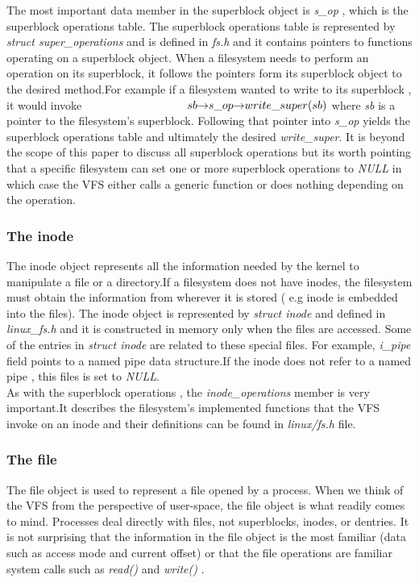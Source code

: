 \documentclass[conference]{IEEEtran}
\begin{document}
The most important data member in the superblock object is {\em s\_op }, which is the superblock operations table. The superblock operations 
table is represented by {\em struct super\_operations } and is defined in {\em fs.h} and it contains pointers
to functions operating on a superblock object. When a filesystem needs to perform an operation on its superblock,
it follows the pointers form its superblock object to the desired method.For example if a filesystem wanted to 
write to its superblock , it would invoke 
\begin{math}\indent\indent\indent\indent\indent\indent sb{\rightarrow}s\_op{\rightarrow}write\_super(sb) \\
\end{math}
where {\em sb} is a pointer to the filesystem's superblock. Following that pointer into {\em s\_op} yields the
superblock operations table and ultimately the desired {\em write\_super}. It is beyond the scope of this paper
to discuss all superblock operations but its worth pointing that a specific filesystem can set one or more superblock 
operations to {\em NULL} in which case the VFS either calls a generic function or does nothing depending on the operation.

\subsubsection{The inode}

The inode object represents all the information needed by the kernel to manipulate a file or a directory.If a filesystem
does not have inodes, the filesystem must obtain the information from wherever it is stored ( e.g inode is embedded into the files).
The inode object is represented by {\em struct inode} and defined in {\em linux\_fs.h} and it is constructed
in memory only when the files are accessed. Some of the entries in {\em struct inode} are related to 
these special files. For example, {\em i\_pipe} field points to a named pipe data structure.If the inode does not 
refer to a named pipe , this files is set to {\em NULL}.\\ 

As with the superblock operations , the {\em inode\_operations}
member is very important.It describes the filesystem's implemented functions that the VFS invoke on an inode and their
definitions can be found in {\em linux/fs.h } file. \\

\subsubsection{The file}
The file object is used to represent a file opened by a process. When we think of the VFS from the 
perspective of user-space, the file object is what readily comes to mind. Processes deal directly with 
files, not superblocks, inodes, or dentries. It is not surprising that the information in the file object 
is the most familiar (data such as access mode and current offset) or that the file operations are 
familiar system calls such as {\em read() } and {\em write() }. \\
\end{document}
